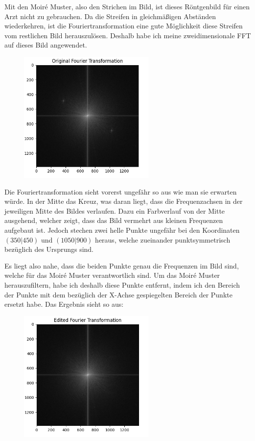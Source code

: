 \documentclass[a4paper,12pt]{article}
\theoremstyle{definition}
\theoremstyle{remark}
\begin{document}
Mit den Moiré Muster, also den Strichen im Bild, ist dieses Röntgenbild für einen Arzt nicht zu gebrauchen. Da die Streifen in gleichmäßigen Abständen wiederkehren,
ist die Fouriertransformation eine gute Möglichkeit diese Streifen vom restlichen Bild herauszulösen. Deshalb habe ich meine zweidimensionale FFT auf dieses Bild angewendet. 

\begin{figure}[H]
\centering
\includegraphics[width=0.6\textwidth]{Bilder/fft_original.png}
\end{figure}

Die Fouriertransformation sieht vorerst ungefähr so aus wie man sie erwarten würde. In der Mitte das Kreuz, was daran liegt, dass die Frequenzachsen in der jeweiligen Mitte 
des Bildes verlaufen. Dazu ein Farbverlauf von der Mitte ausgehend, welcher zeigt, dass das Bild vermehrt aus kleinen Frequenzen aufgebaut ist. Jedoch stechen zwei 
helle Punkte ungefähr bei den Koordinaten $\left(350 \vert 450\right)$ und $\left(1050 \vert 900\right)$ heraus, welche zueinander punktsymmetrisch bezüglich des Ursprungs sind. 

Es liegt also nahe, dass die beiden Punkte genau die Frequenzen im Bild sind, welche für das Moiré Muster verantwortlich sind. Um das Moiré Muster herauszufiltern, habe ich deshalb diese 
Punkte entfernt, indem ich den Bereich der Punkte mit dem bezüglich der X-Achse gespiegelten Bereich der Punkte ersetzt habe. Das Ergebnis sieht so aus:

\begin{figure}[H]
\centering
\includegraphics[width=0.6\textwidth]{Bilder/fft_edited.png}
\end{figure}
\end{document}
